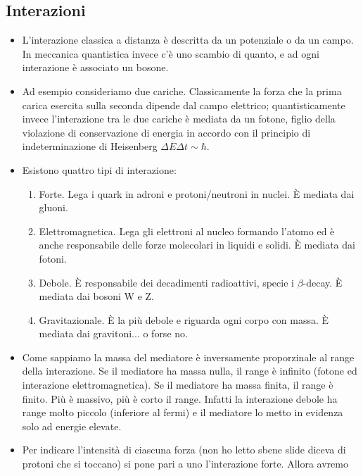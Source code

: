 \subsection{Interazioni}
\begin{itemize}
    \item L'interazione classica a distanza è descritta da un potenziale o da un campo. In meccanica quantistica invece c'è uno scambio di quanto, e ad ogni interazione è associato un bosone.
    \item Ad esempio consideriamo due cariche. Classicamente la forza che la prima carica esercita sulla seconda dipende dal campo elettrico; quantisticamente invece l'interazione tra le due cariche è mediata da un fotone, figlio della violazione di conservazione di energia in accordo con il principio di indeterminazione di Heisenberg $\Delta E\Delta t\sim\hbar$.
    \item Esistono quattro tipi di interazione: 
    \begin{enumerate}
        \item Forte. Lega i quark in adroni e protoni/neutroni in nuclei. È mediata dai gluoni.
        \item Elettromagnetica. Lega gli elettroni al nucleo formando l'atomo ed è anche responsabile delle forze molecolari in liquidi e solidi. È mediata dai fotoni.
        \item Debole. È responsabile dei decadimenti radioattivi, specie i $\beta$-decay. È mediata dai bosoni W e Z.
        \item Gravitazionale. È la più debole e riguarda ogni corpo con massa. È mediata dai gravitoni... o forse no.
    \end{enumerate}
    \item Come sappiamo la massa del mediatore è inversamente proporzinale al range della interazione. Se il mediatore ha massa nulla, il range è infinito (fotone ed interazione elettromagnetica). Se il mediatore ha massa finita, il range è finito. Più è massivo, più è corto il range. Infatti la interazione debole ha range molto piccolo (inferiore al fermi) e il mediatore lo metto in evidenza solo ad energie elevate.
    \item Per indicare l'intensità di ciascuna forza (non ho letto sbene slide diceva di protoni che si toccano) si pone pari a uno l'interazione forte. Allora avremo \\
    \begin{tabular}{>{\centering\arraybackslash}m{3cm} >{\centering\arraybackslash}m{3cm} >{\centering\arraybackslash}m{3cm} >{\centering\arraybackslash}m{3cm}}

\end{tabular}
\end{itemize}
